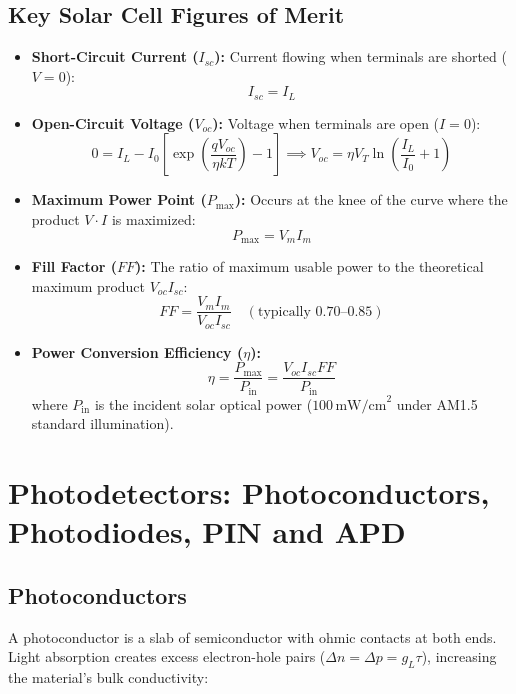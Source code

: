 \documentclass[12pt,a4paper]{article}
\begin{document}
\subsection{Key Solar Cell Figures of Merit}
\begin{itemize}[leftmargin=*, itemsep=3.5pt]
  \item \textbf{Short-Circuit Current ($I_{sc}$):} Current flowing when terminals are shorted ($V = 0$):
  \begin{equation}
    I_{sc} = I_L
  \end{equation}
  \item \textbf{Open-Circuit Voltage ($V_{oc}$):} Voltage when terminals are open ($I = 0$):
  \begin{equation}
    0 = I_L - I_0 \left[ \exp\left(\frac{q V_{oc}}{\eta k T}\right) - 1 \right] \implies V_{oc} = \eta V_T \ln\left(\frac{I_L}{I_0} + 1\right)
  \end{equation}
  \item \textbf{Maximum Power Point ($P_{\text{max}}$):} Occurs at the knee of the curve where the product $V \cdot I$ is maximized:
  \begin{equation}
    P_{\text{max}} = V_m I_m
  \end{equation}
  \item \textbf{Fill Factor ($FF$):} The ratio of maximum usable power to the theoretical maximum product $V_{oc} I_{sc}$:
  \begin{equation}
    FF = \frac{V_m I_m}{V_{oc} I_{sc}} \quad (\text{typically } 0.70\text{--}0.85)
  \end{equation}
  \item \textbf{Power Conversion Efficiency ($\eta$):}
  \begin{equation}
    \eta = \frac{P_{\text{max}}}{P_{\text{in}}} = \frac{V_{oc} I_{sc} FF}{P_{\text{in}}}
  \end{equation}
  where $P_{\text{in}}$ is the incident solar optical power ($100\,\text{mW/cm}^2$ under AM1.5 standard illumination).
\end{itemize}

\section{Photodetectors: Photoconductors, Photodiodes, PIN and APD}

\subsection{Photoconductors}
A photoconductor is a slab of semiconductor with ohmic contacts at both ends. Light absorption creates excess electron-hole pairs ($\Delta n = \Delta p = g_L \tau$), increasing the material's bulk conductivity:
\end{document}
